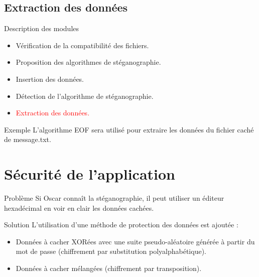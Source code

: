\documentclass{beamer}
\begin{document}
  \subsection{Extraction des données}
  \begin{frame} %
	\begin{block}{Description des modules}
	\begin{itemize}
	[circle]
	\item Vérification de la compatibilité des fichiers.
	\item Proposition des algorithmes de stéganographie.
	\item Insertion des données.
	\item Détection de l'algorithme de stéganographie.
	\item \textcolor{red}{Extraction des données.}
	\end{itemize}
	\end{block}
	
	\begin{exampleblock}{Exemple} 
	L'algorithme EOF sera utilisé pour extraire les  données du fichier 
	caché de message.txt. 
	\end{exampleblock}
  \end{frame}
  
  \section{Sécurité de l'application}
  \begin{frame}
	\begin{alertblock}{Problème} 
	Si Oscar connaît la stéganographie, il peut utiliser un éditeur 
	hexadécimal en voir en clair les données cachées.
	\end{alertblock}
	
	\begin{exampleblock}{Solution} 
	L'utilisation d'une méthode de protection des données est ajoutée : 
	 \begin{itemize}
	 [circle]
	\item Données à cacher XORées avec une suite pseudo-aléatoire générée
	à partir du mot de passe (chiffrement par substitution polyalphabétique).
	\item Données à cacher mélangées (chiffrement par transposition).
	\end{itemize}
	\end{exampleblock}
  \end{frame}
  
\end{document}
